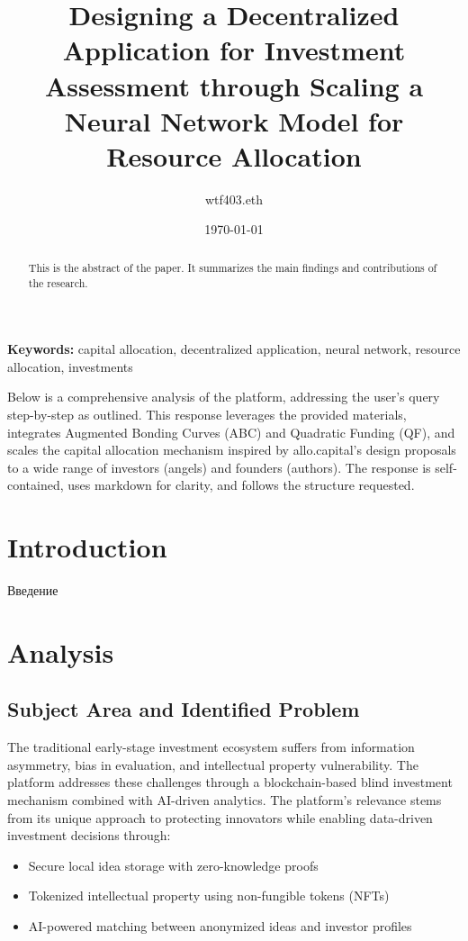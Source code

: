 \documentclass[12pt]{article}
\begin{document}
\title{Designing a Decentralized Application for Investment Assessment through Scaling a Neural Network Model for Resource Allocation}
\author{wtf403.eth}
\date{\today}
\maketitle

\begin{abstract}
    This is the abstract of the paper. It summarizes the main findings and contributions of the research.
\end{abstract}

\textbf{Keywords:} capital allocation, decentralized application, neural network, resource allocation, investments

Below is a comprehensive analysis of the platform, addressing the user's query step-by-step as outlined. This response leverages the provided materials, integrates Augmented Bonding Curves (ABC) and Quadratic Funding (QF), and scales the capital allocation mechanism inspired by allo.capital's design proposals to a wide range of investors (angels) and founders (authors). The response is self-contained, uses markdown for clarity, and follows the structure requested.

\section{Introduction}

Введение

\section{Analysis}

\subsection{Subject Area and Identified Problem}
The traditional early-stage investment ecosystem suffers from information asymmetry, bias in evaluation, and intellectual property vulnerability. The platform addresses these challenges through a blockchain-based blind investment mechanism combined with AI-driven analytics. The platform's relevance stems from its unique approach to protecting innovators while enabling data-driven investment decisions through:
\begin{itemize}
    \item Secure local idea storage with zero-knowledge proofs
    \item Tokenized intellectual property using non-fungible tokens (NFTs)
    \item AI-powered matching between anonymized ideas and investor profiles
\end{itemize}
\end{document}

